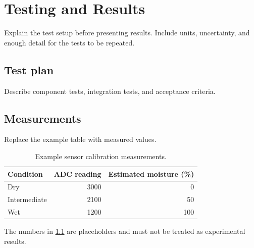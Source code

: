 \chapter{Testing and Results}
\label{chap:results}

Explain the test setup before presenting results. Include units, uncertainty,
and enough detail for the tests to be repeated.

\section{Test plan}

Describe component tests, integration tests, and acceptance criteria.

\section{Measurements}

Replace the example table with measured values.

\begin{table}[htbp]
  \centering
  \caption{Example sensor calibration measurements.}
  \label{tab:sensor-calibration}
  \begin{tabular}{lrr}
    \toprule
    Condition & ADC reading & Estimated moisture (\%) \\
    \midrule
    Dry & 3000 & 0 \\
    Intermediate & 2100 & 50 \\
    Wet & 1200 & 100 \\
    \bottomrule
  \end{tabular}
\end{table}

The numbers in \cref{tab:sensor-calibration} are placeholders and must not be
treated as experimental results.
